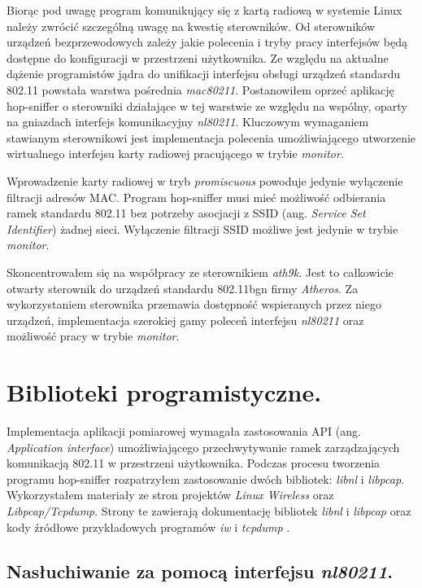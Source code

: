 Biorąc pod uwagę program komunikujący się z kartą radiową w systemie Linux należy zwrócić szczególną uwagę na kwestię sterowników. Od sterowników urządzeń bezprzewodowych zależy jakie polecenia i tryby pracy interfejsów będą dostępne do konfiguracji w przestrzeni użytkownika. Ze względu na aktualne dążenie programistów jądra do unifikacji interfejsu obsługi urządzeń standardu 802.11 powstała warstwa pośrednia \emph{mac80211}. Postanowiłem oprzeć aplikację hop-sniffer o sterowniki działające w tej warstwie ze względu na wspólny, oparty na gniazdach interfejs komunikacyjny \emph{nl80211}. Kluczowym wymaganiem stawianym sterownikowi jest implementacja polecenia umożliwiającego utworzenie wirtualnego interfejsu karty radiowej pracującego w trybie \emph{monitor}.

Wprowadzenie karty radiowej w tryb \emph{promiscuous} powoduje jedynie wyłączenie filtracji adresów MAC. Program hop-sniffer musi mieć możliwość odbierania ramek standardu 802.11 bez potrzeby asocjacji z SSID (ang. \emph{Service Set Identifier}) żadnej sieci. Wyłączenie filtracji SSID możliwe jest jedynie w trybie \emph{monitor}.

Skoncentrowałem się na współpracy ze sterownikiem \emph{ath9k}. Jest to całkowicie otwarty sterownik do urządzeń standardu 802.11bgn firmy \emph{Atheros}. Za wykorzystaniem sterownika przemawia dostępność wspieranych przez niego urządzeń, implementacja szerokiej gamy poleceń interfejsu \emph{nl80211} oraz możliwość pracy w trybie \emph{monitor}.

\section{Biblioteki programistyczne.}

Implementacja aplikacji pomiarowej wymagała zastosowania API (ang. \emph{Application interface}) umożliwiającego przechwytywanie ramek zarządzających komunikacją 802.11 w przestrzeni użytkownika. Podczas procesu tworzenia programu hop-sniffer rozpatrzyłem zastosowanie dwóch bibliotek: \emph{libnl} i \emph{libpcap}. Wykorzystałem materiały ze stron projektów \emph{Linux Wireless} oraz \emph{Libpcap/Tcpdump}. Strony te zawierają dokumentację bibliotek \emph{libnl} \cite{www:LibnlDoc} i \emph{libpcap} \cite{www:LibPcapDoc} oraz kody źródłowe przykładowych programów \emph{iw} \cite{www:IWSrc} i \emph{tcpdump} \cite{www:TcpDumpSrc}. 

\subsection{Nasłuchiwanie za pomocą interfejsu \emph{nl80211}.}

